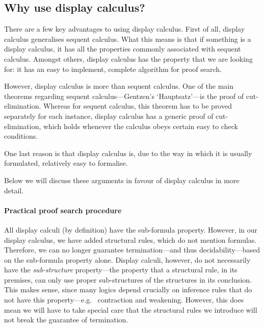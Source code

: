 \subsection{Why use display calculus?}
\label{sec:why-use-display-calculus}
There are a few key advantages to using display calculus. First of
all, display calculus generalises sequent calculus. What this means is
that if something is a display calculus, it has all the properties
commonly associated with sequent calculus. Amongst others, display
calculus has the property that we are looking for: it has an easy to
implement, complete algorithm for proof search.

However, display calculus is more than sequent calculus. One of the
main theorems regarding sequent calculus---Gentzen's `Hauptsatz'---is
the proof of cut-elimination. Whereas for sequent calculus, this
theorem has to be proved separately for each instance, display
calculus has a generic proof of cut-elimination, which holds whenever
the calculus obeys certain easy to check conditions.

One last reason is that display calculus is, due to the way in which
it is usually formulated, relatively easy to formalise.

Below we will discuss these arguments in favour of display calculus in
more detail.

\paragraph{Practical proof search procedure}
All display calculi (by definition) have the sub-formula
property. However, in our display calculus, we have added structural
rules, which do not mention formulas. Therefore, we can no longer
guarantee termination---and thus decidability---based on the
sub-formula property alone.
Display calculi, however, do not necessarily have the
\emph{sub-structure} property---the property that a structural rule,
in its premises, can only use proper sub-structures of the structures
in its conclusion. This makes sense, since many logics depend
crucially on inference rules that do not have this property---e.g.\ %
contraction and weakening.
However, this does mean we will have to take special care that the
structural rules we introduce will not break the guarantee of
termination.

